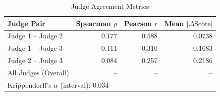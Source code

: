 \begin{table}[htbp]
\centering
\caption{Judge Agreement Metrics}
\label{tab:judge_agreement}
\begin{tabular}{lrrr}
\toprule
Judge Pair & Spearman $\rho$ & Pearson $r$ & Mean $|\Delta \text{Score}|$ \\
\midrule
Judge 1 – Judge 2 & 0.177 & 0.588 & 0.0738 \\
Judge 1 – Judge 3 & 0.111 & 0.310 & 0.1683 \\
Judge 2 – Judge 3 & 0.084 & 0.257 & 0.2186 \\
All Judges (Overall) & -- & -- & -- \\
\midrule
\multicolumn{4}{l}{Krippendorff's $\alpha$ (interval): 0.034} \\
\bottomrule
\end{tabular}
\end{table}

